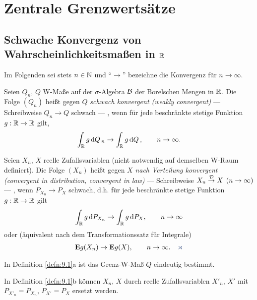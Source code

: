 \chapter{Zentrale Grenzwertsätze}
\label{chap:9}

\section{Schwache Konvergenz von Wahrscheinlichkeitsmaßen in $\mathbb{R} $}

Im Folgenden sei stets $n\in \mathbb{N}$ und ``$\to$'' bezeichne die Konvergenz für
$n\to\infty$.

\begin{defn}
\label{defn:9.1}
\begin{defnenum}%
\item Seien $Q_{n}$, $Q$ W-Maße auf der $\sigma$-Algebra
  ${\mathcal{B}}$ der Borelschen Mengen in $\mathbb{R}$. Die Folge $(Q_{n})$ heißt
  gegen $Q$ \emph{schwach konvergent (weakly convergent)} --- Schreibweise
  $Q_{n} \to Q $ schwach --- , wenn für jede beschränkte stetige Funktion $g:
  \mathbb{R}\to \mathbb{R}$ gilt,
\begin{align*}
\int_{\mathbb{R}} g\,\mathrm{d} Q\,_{n} \to \int_{\mathbb{R}}g\,\mathrm{d} Q\,, \qquad n\to
\infty.
\end{align*}
\item Seien $X_{n}$, $X$ reelle Zufallsvariablen (nicht notwendig
auf demselben W-Raum definiert). Die Folge $(X_{n})$ heißt gegen $X$ 
\emph{nach Verteilung konvergent (convergent in distribution, convergent in
law)} --- Schreibweise $X_{n}\overset{\mathcal{D}}{\to} X\;\, (n\to\infty)$ --- ,
wenn $P_{X_{n}}\to P_{X}$ schwach, d.h. für jede beschränkte stetige Funktion $g:\mathbb{R}\to \mathbb{R}$ gilt
\begin{align*}
\int_{\mathbb{R}} g\,\mathrm{d} P_{X_{n}}\to \int_{\mathbb{R}} g\,\mathrm{d} P_{X}, \qquad n\to
\infty
\end{align*}
oder (äquivalent nach dem Transformationssatz für Integrale)
\begin{align*}
\E g (X_{n}) \to \E g (X), \qquad n\to \infty.\fishhere
\end{align*}
\end{defnenum}
\end{defn}

\begin{bem}[Bemerkungen.]
\label{bem:9.1}
\begin{bemenum}%
\item In Definition \ref{defn:9.1}a ist das Grenz-W-Maß $Q$ eindeutig 
bestimmt.
\item In Definition \ref{defn:9.1}b können $X_{n}$, $X$ durch reelle
Zufallsvariablen $X'_{n}$, $X'$ mit $P_{X'_{n}} = P_{X_{n}}$, $P_{X'} =P_{X}$
ersetzt werden.\maphere
\end{bemenum}
\end{bem}

